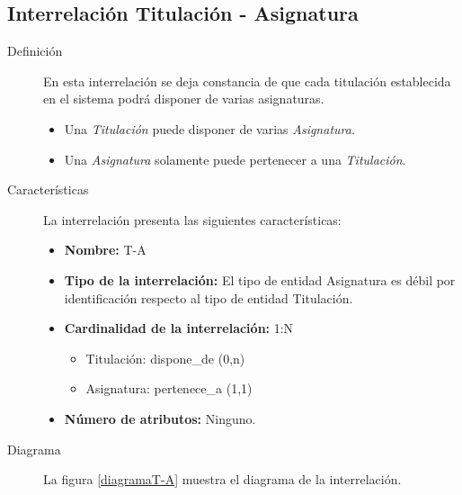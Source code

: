 \subsection{Interrelación Titulación - Asignatura}

   \begin{description}
      \item[Definición] En esta interrelación se deja constancia de que cada
      titulación establecida en el sistema podrá disponer de varias asignaturas.

      \begin{itemize}
       \item Una \textit{Titulación} puede disponer de varias
             \textit{Asignatura}.
       \item Una \textit{Asignatura} solamente puede pertenecer a una
             \textit{Titulación}.
      \end{itemize}

      \item[Características] La interrelación presenta las siguientes
                             características:

         \begin{itemize}
            \item \textbf{Nombre:} T-A
            \item \textbf{Tipo de la interrelación:} El tipo de entidad
                  Asignatura es débil por identificación respecto al tipo de
                  entidad Titulación.
            \item \textbf{Cardinalidad de la interrelación:} 1:N
                  \begin{itemize}
                     \item Titulación: dispone\_de (0,n)
                     \item Asignatura: pertenece\_a (1,1)
                  \end{itemize}
            \item \textbf{Número de atributos:} Ninguno.
         \end{itemize}

      \item[Diagrama] La figura \ref{diagramaT-A} muestra el diagrama de la
                      interrelación.


\end{description}
